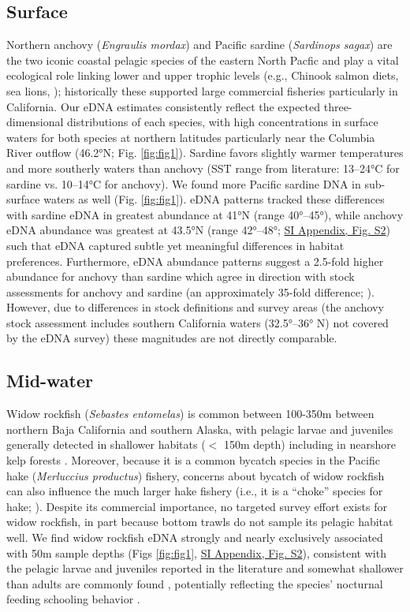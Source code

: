 \documentclass{article}
\begin{document}
\subsection*{Surface}
Northern anchovy (\textit{Engraulis mordax}) and Pacific sardine (\textit{Sardinops sagax}) are the two iconic coastal pelagic species of the eastern North Pacfic \cite{steinbeck1945} and play a vital ecological role linking lower and upper trophic levels (e.g., Chinook salmon diets, sea lions, \cite{kaplan2019}); historically these supported large commercial fisheries particularly in California. Our eDNA estimates consistently reflect the expected three-dimensional distributions of each species, with high concentrations in surface waters for both species at northern latitudes \cite{litz2008,parnel2008} particularly near the Columbia River outflow (46.2°N; Fig. \ref{fig:fig1}). Sardine favors slightly warmer temperatures and more southerly waters than anchovy (SST range from literature: 13–24°C for sardine vs. 10–14°C for anchovy).  We found more Pacific sardine DNA in sub-surface waters as well (Fig. \ref{fig:fig1}). eDNA patterns tracked these differences with sardine eDNA in greatest abundance at 41°N (range 40°–45°), while anchovy eDNA abundance was greatest at 43.5°N (range 42°–48°; \href{SI_Appendix.pdf}{SI Appendix, Fig. S2}) such that eDNA captured subtle yet meaningful differences in habitat preferences. Furthermore, eDNA abundance patterns suggest a 2.5-fold higher abundance for anchovy than sardine which agree in direction with stock assessments for anchovy and sardine (an approximately 35-fold difference; \cite{kuriyama2022, kuriyama2022b}). However, due to differences in stock definitions and survey areas (the anchovy stock assessment includes southern California waters (32.5°–36° N) not covered by the eDNA survey) these magnitudes are not directly comparable.

\subsection*{Mid-water}
Widow rockfish (\textit{Sebastes entomelas}) is common between 100-350m between northern Baja California and southern Alaska, with pelagic larvae and juveniles generally detected in shallower habitats ($<$ 150m depth) \cite{reynolds2001,bosley2014} including in nearshore kelp forests \cite{quigley2024, laidig2007} . Moreover, because it is a common bycatch species in the Pacific hake (\textit{Merluccius productus}) fishery, concerns about bycatch of widow rockfish can also influence the much larger hake fishery (i.e., it is a “choke” species for hake; \cite{somers2018}). Despite its commercial importance, no targeted survey effort exists for widow rockfish, in part because bottom trawls do not sample its pelagic habitat well. We find widow rockfish eDNA strongly and nearly exclusively associated with 50m sample depths (Figs \ref{fig:fig1}, \href{SI_Appendix.pdf}{SI Appendix, Fig. S2}), consistent with the pelagic larvae and juveniles reported in the literature and somewhat shallower than adults are commonly found \cite{reynolds2001,bosley2014,quigley2024}, potentially reflecting the species’ nocturnal feeding schooling behavior \cite{reynolds2001,bosley2014}.
\end{document}
